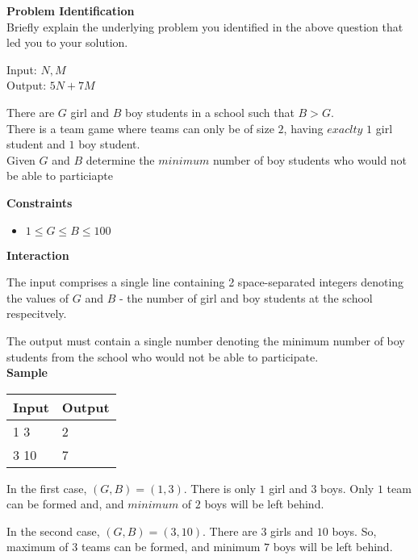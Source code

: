\documentclass[a4paper]{exam}
\newcommand\heading[1]{\textbf{#1}}
\begin{document}
\begin{questions}
    \heading{Problem Identification}\\
    Briefly explain the underlying problem you identified in the above question that led you to your solution.

    \begin{mdframed}
      Input: $N,M$\\
      Output: $5N+7M$
    \end{mdframed}



    There are $G$ girl and $B$ boy students in a school such that $B>G$.
    \\
    There is a team game where teams can only be of size $2$, having $exaclty$ $1$ girl student and $1$ boy student.\\


    Given $G$ and $B$ determine the $minimum$ number of boy students who would not be able to particiapte

    \heading{Constraints}
    \begin{itemize}
        \item $1 \le G \le B \le 100$
    \end{itemize}


    \heading{Interaction}

    The input comprises a single line containing 2 space-separated integers denoting the values of $G$ and $B$ - the number of girl and boy students at the school respecitvely.

    The output must contain a single number denoting the minimum number of boy students from the school who would not be able to participate.\\
    \heading{Sample}

    \begin{tabularx}{\textwidth}{|X|X|}
        \rowcolor{gray!50}
        \hline
        Input & Output \\ \hline\hline
        1 3   & 2      \\\hline
        3 10  & 7      \\\hline
    \end{tabularx}

    In the first case, $(G,B)=(1,3)$. There is only $1$ girl and $3$ boys. Only $1$ team can be formed and, and $minimum$ of $2$ boys will be left behind.

    In the second case, $(G,B)=(3,10)$. There are $3$ girls and $10$ boys. So, maximum of $3$ teams can be formed, and minimum $7$ boys will be left behind.


\end{questions}
\end{document}
